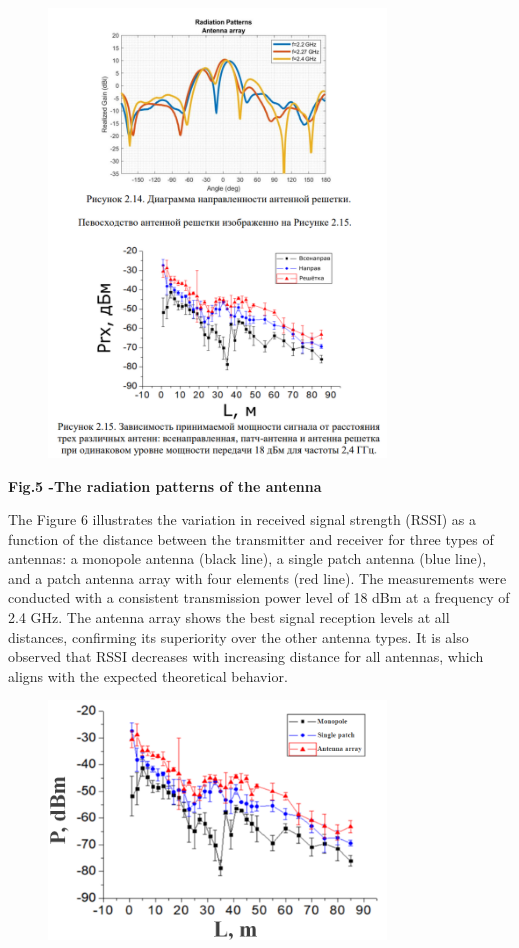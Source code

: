\begin{figure}[H]
	\centering
	\includegraphics[width=0.8\textwidth]{media/ict/image45}
	\caption*{}
\end{figure}


{\bfseries Fig.5 -The radiation patterns of the antenna}

The Figure 6 illustrates the variation in received signal strength
(RSSI) as a function of the distance between the transmitter and
receiver for three types of antennas: a monopole antenna (black line), a
single patch antenna (blue line), and a patch antenna array with four
elements (red line). The measurements were conducted with a consistent
transmission power level of 18 dBm at a frequency of 2.4 GHz. The
antenna array shows the best signal reception levels at all distances,
confirming its superiority over the other antenna types. It is also
observed that RSSI decreases with increasing distance for all antennas,
which aligns with the expected theoretical behavior.


\begin{figure}[H]
	\centering
	\includegraphics[width=0.8\textwidth]{media/ict/image46}
	\caption*{}
\end{figure}



